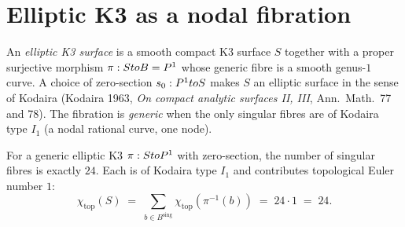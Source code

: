 \section{Elliptic K3 as a nodal fibration}
\label{gluing:sec:k3xe-elliptic-fibration}

\begin{definition}
\label{gluing:def:elliptic-K3}
An \emph{elliptic K3 surface} is a smooth compact K3 surface $S$
together with a proper surjective morphism $\pi: S to B = P^1$
whose generic fibre is a smooth genus-$1$ curve. A choice of zero-section
$s_0 : P^1 to S$ makes $S$ an elliptic surface in the sense of
Kodaira (Kodaira 1963, \emph{On compact analytic surfaces II, III},
Ann.\ Math.\ 77 and 78). The fibration is \emph{generic} when the only
singular fibres are of Kodaira type $I_1$ (a nodal rational curve, one
node).
\end{definition}

\begin{proposition}[Kodaira's $\chi=24$ identity on generic elliptic K3]
\label{gluing:prop:kodaira-24}
For a generic elliptic K3 $\pi: S to P^1$ with zero-section,
the number of singular fibres is exactly $24$. Each is of Kodaira type
$I_1$ and contributes topological Euler number $1$:
\[
 \chi_{\mathrm{top}}(S) \;=\; \sum_{b \in B^{\mathrm{sing}}}
 \chi_{\mathrm{top}}(\pi^{-1}(b)) \;=\; 24 \cdot 1 \;=\; 24.
\]
\end{proposition}

